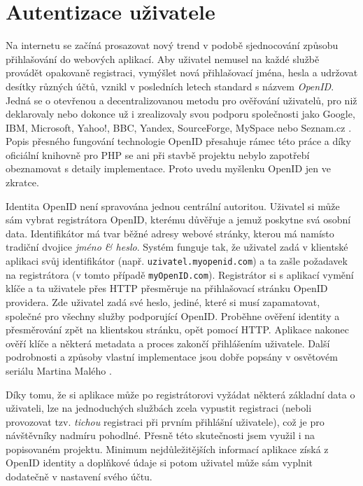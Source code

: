 \section{Autentizace uživatele}\label{openid}
Na internetu se začíná prosazovat nový trend v podobě sjednocování
způsobu přihlašování do webových aplikací. Aby uživatel nemusel na každé
službě provádět opakovaně registraci, vymýšlet nová
přihlašovací jména, hesla a udržovat desítky různých účtů, vznikl v
posledních letech standard s názvem {\it OpenID}. Jedná se o
otevřenou a decentralizovanou metodu pro ověřování uživatelů, pro niž
deklarovaly nebo dokonce už i zrealizovaly svou podporu společnosti
jako Google, IBM, Microsoft, Yahoo!, BBC, Yandex, SourceForge, MySpace
nebo Seznam.cz \cite{dataportability}. Popis přesného fungování technologie
OpenID přesahuje rámec této práce a díky oficiální knihovně pro PHP
se ani při stavbě projektu nebylo zapotřebí obeznamovat s detaily
implementace. Proto uvedu myšlenku OpenID jen ve zkratce.

Identita OpenID není spravována jednou centrální autoritou. Uživatel
si může sám vybrat registrátora OpenID, kterému důvěřuje a jemuž
poskytne svá osobní data. Identifikátor má tvar běžné adresy webové
stránky, kterou má namísto tradiční dvojice {\it jméno \& heslo}.
Systém funguje tak, že uživatel zadá v klientské aplikaci svůj
identifikátor (např. {\tt uzivatel.myopenid.com}) a ta zašle
požadavek na registrátora (v tomto případě {\tt myOpenID.com}).
Registrátor si s aplikací vymění klíče a ta uživatele přes HTTP
přesměruje na přihlašovací stránku OpenID providera. Zde uživatel
zadá své heslo, jediné, které si musí zapamatovat, společné pro
všechny služby podporující OpenID. Proběhne ověření identity a
přesměrování zpět na klientskou stránku, opět pomocí HTTP. Aplikace
nakonec ověří klíče a některá metadata a proces zakončí přihlášením
uživatele. Další podrobnosti a způsoby vlastní implementace jsou
dobře popsány v osvětovém seriálu Martina Malého \cite{openid}.

Díky tomu, že si aplikace může po registrátorovi vyžádat některá
základní data o uživateli, lze na jednoduchých službách zcela
vypustit registraci (neboli provozovat tzv. {\it tichou} registraci
při prvním přihlášní uživatele), což je pro návštěvníky nadmíru
pohodlné. Přesně této skutečnosti jsem využil i na popisovaném
projektu. Minimum nej\-důležitějších informací aplikace získá z OpenID
identity a doplňkové údaje si potom uživatel může sám vyplnit
dodatečně v nastavení svého účtu.

